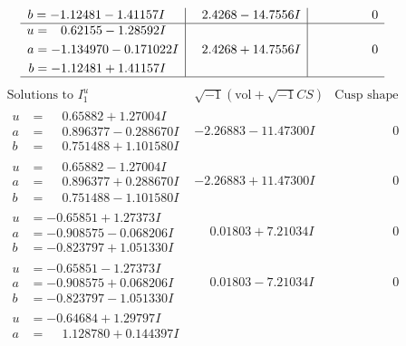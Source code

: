 \documentclass[1p]{elsarticle_modified}
\theoremstyle{definition}
\newcommand{\I}{\sqrt{-1}}
\begin{document}
$$\begin{array}{c|c|c}
\begin{aligned}
b &= -1.12481 - 1.41157 I\end{aligned}
 & \phantom{-}2.4268 - 14.7556 I & \phantom{-0.000000 } 0 \\ \hline\begin{aligned}
u &= \phantom{-}0.62155 - 1.28592 I \\
a &= -1.134970 - 0.171022 I \\
b &= -1.12481 + 1.41157 I\end{aligned}
 & \phantom{-}2.4268 + 14.7556 I & \phantom{-0.000000 } 0\\
 \hline 
 \end{array}$$\newpage$$\begin{array}{c|c|c}  
\text{Solutions to }I^u_{1}& \I (\text{vol} + \sqrt{-1}CS) & \text{Cusp shape}\\
 \hline 
\begin{aligned}
u &= \phantom{-}0.65882 + 1.27004 I \\
a &= \phantom{-}0.896377 - 0.288670 I \\
b &= \phantom{-}0.751488 + 1.101580 I\end{aligned}
 & -2.26883 - 11.47300 I & \phantom{-0.000000 } 0 \\ \hline\begin{aligned}
u &= \phantom{-}0.65882 - 1.27004 I \\
a &= \phantom{-}0.896377 + 0.288670 I \\
b &= \phantom{-}0.751488 - 1.101580 I\end{aligned}
 & -2.26883 + 11.47300 I & \phantom{-0.000000 } 0 \\ \hline\begin{aligned}
u &= -0.65851 + 1.27373 I \\
a &= -0.908575 - 0.068206 I \\
b &= -0.823797 + 1.051330 I\end{aligned}
 & \phantom{-}0.01803 + 7.21034 I & \phantom{-0.000000 } 0 \\ \hline\begin{aligned}
u &= -0.65851 - 1.27373 I \\
a &= -0.908575 + 0.068206 I \\
b &= -0.823797 - 1.051330 I\end{aligned}
 & \phantom{-}0.01803 - 7.21034 I & \phantom{-0.000000 } 0 \\ \hline\begin{aligned}
u &= -0.64684 + 1.29797 I \\
a &= \phantom{-}1.128780 + 0.144397 I \\

\end{aligned}
\end{array}$$
\end{document}
